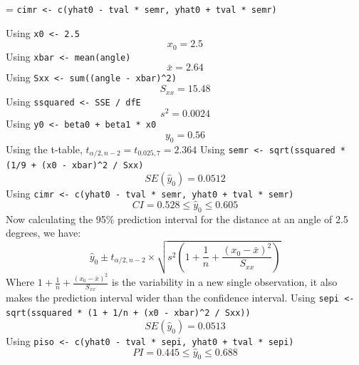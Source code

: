 \documentclass[12pt]{article}
\begin{document}
\begin{enumerate}[1.]
\begin{enumerate}
\begin{enumerate}
                = \texttt{cimr <- c(yhat0 - tval * semr, yhat0 + tval * semr)}
            \end{enumerate}
            Using \texttt{x0 <- 2.5}
            \[ x_0 = 2.5 \]
            Using \texttt{xbar <- mean(angle)}
            \[ \bar{x} = 2.64 \]
            Using \texttt{Sxx <- sum((angle - xbar)\^{}2)}
            \[ S_{xx} = 15.48 \]
            Using \texttt{ssquared <- SSE / dfE}
            \[ s^2 = 0.0024 \]
            Using \texttt{y0 <- beta0 + beta1 * x0}
            \[ y_0 = 0.56 \]
            Using the t-table,
            $t_{\alpha / 2, n-2} = t_{0.025, 7} = 2.364$
            Using  \texttt{semr <- sqrt(ssquared * (1/9 + (x0 - xbar)\^{}2 / Sxx)}
            \[ SE(\hat{y}_0) = 0.0512 \]
            Using \texttt{cimr <- c(yhat0 - tval * semr, yhat0 + tval * semr)}
            \[ CI = 0.528 \leq \hat{y}_0 \leq 0.605 \]
            Now calculating the 95\% prediction interval for the distance at an angle of 2.5 degrees, we have:
            \[\hat{y}_0 \pm t_{\alpha / 2, n-2} \times \sqrt{s^2 \left(1 + \frac{1}{n} + \frac{(x_0 - \bar{x})^2}{S_{xx}} \right)}\]
            Where $1 + \frac{1}{n} + \frac{(x_0 - \bar{x})^2}{S_{xx}}$ is the variability in a new single observation, it also makes the 
            prediction interval wider than the confidence interval.
            Using \texttt{sepi <-  sqrt(ssquared * (1 + 1/n + (x0 - xbar)\^{}2 / Sxx))}
            \[ SE(\hat{y}_0) = 0.0513 \]
            Using \texttt{piso <- c(yhat0 - tval * sepi, yhat0 + tval * sepi)}
            \[ PI = 0.445 \leq \hat{y}_0 \leq 0.688 \]
        \end{enumerate}


\end{enumerate}
\end{document}
